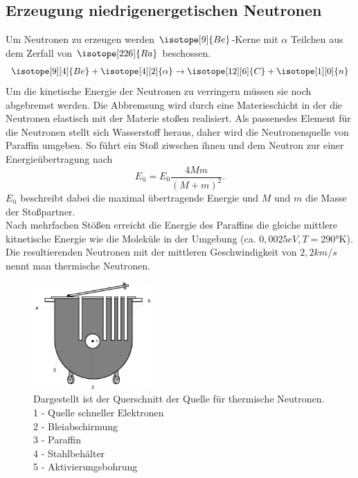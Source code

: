 \subsection{Erzeugung niedrigenergetischen Neutronen}
Um Neutronen zu erzeugen werden $\isotope[9]{Be}$-Kerne mit $\alpha$ Teilchen aus dem Zerfall von $\isotope[226]{Ra}$ beschossen.
\begin{equation}
    \isotope[9][4]{Be} + \isotope[4][2]{\alpha} \to \isotope[12][6]{C} + \isotope[1][0]{n}
\end{equation}
Um die kinetische Energie der Neutronen zu verringern müssen sie noch abgebremst werden.
Die Abbremsung wird durch eine Materieschicht in der die Neutronen elastisch mit der 
Materie stoßen realisiert. 
Als passenedes Element für die Neutronen stellt sich 
Wasserstoff heraus, daher wird die Neutronenquelle von Paraffin umgeben. 
So führt ein Stoß ziwschen ihnen und dem Neutron zur einer Energieübertragung nach
\begin{equation}
    E_ü=E_0\frac{4Mm}{(M+m)^2}.
\end{equation}
$E_ü$ beschreibt dabei die maximal übertragende Energie und $M$ und $m$ die Masse 
der Stoßpartner.\\
Nach mehrfachen Stößen erreicht die Energie des Paraffins die gleiche mittlere 
kitnetische Energie wie die Moleküle in der Umgebung (ca. $0,0025\si{eV},
T=290\text{°K}$). Die resultierenden Neutronen mit der mittleren Geschwindigkeit 
von $2,2\si{km/s}$ nennt man thermische Neutronen.
\begin{figure}
    \centering
    \includegraphics[width=0.4\textwidth]{bilder/Quelle.jpg}
    \caption{Dargestellt ist der Querschnitt der Quelle für thermische Neutronen.\cite[213]{anleitung}\\
    1 - Quelle schneller Elektronen\\
    2 - Bleiabschirmung\\
    3 - Paraffin\\
    4 - Stahlbehälter\\
    5 - Aktivierungsbohrung}
\end{figure}
